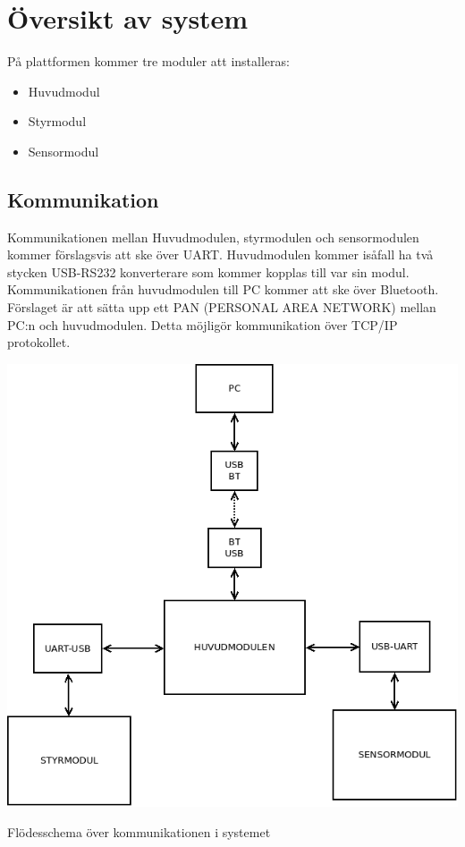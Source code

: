 \section{Översikt av system}
På plattformen kommer tre moduler att installeras:

\begin{itemize}
\item Huvudmodul
\item Styrmodul
\item Sensormodul
\end{itemize}
\subsection{Kommunikation}
Kommunikationen mellan Huvudmodulen, styrmodulen och sensormodulen kommer förslagsvis att ske över UART. Huvudmodulen kommer isåfall ha två stycken USB-RS232 konverterare som kommer kopplas till var sin modul. Kommunikationen från huvudmodulen till PC kommer att ske över Bluetooth. Förslaget är att sätta upp ett PAN (PERSONAL AREA NETWORK) mellan PC:n och huvudmodulen. Detta möjligör kommunikation över TCP/IP protokollet.
\newline
\centerline{\includegraphics[scale=0.4]{FLOW1PNG}}
\centerline{Flödesschema över kommunikationen i systemet}
\newline
\newline
